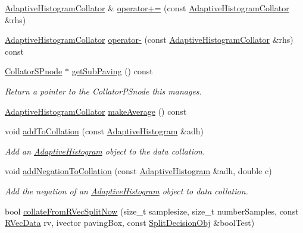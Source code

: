 \begin{DoxyCompactItemize}
\item 
\hyperlink{classsubpavings_1_1AdaptiveHistogramCollator}{\-Adaptive\-Histogram\-Collator} \& \hyperlink{classsubpavings_1_1AdaptiveHistogramCollator_ab1c2f300d93647faa0ca12e52b6405f0}{operator+=} (const \hyperlink{classsubpavings_1_1AdaptiveHistogramCollator}{\-Adaptive\-Histogram\-Collator} \&rhs)
\item 
\hyperlink{classsubpavings_1_1AdaptiveHistogramCollator}{\-Adaptive\-Histogram\-Collator} \hyperlink{classsubpavings_1_1AdaptiveHistogramCollator_aa7ed65f2fced9b8e9e727876e84661c5}{operator-\/} (const \hyperlink{classsubpavings_1_1AdaptiveHistogramCollator}{\-Adaptive\-Histogram\-Collator} \&rhs) const 
\item 
\hyperlink{classsubpavings_1_1CollatorSPnode}{\-Collator\-S\-Pnode} $\ast$ \hyperlink{classsubpavings_1_1AdaptiveHistogramCollator_ac7545dd3425c4570bd9e0fde17ad9294}{get\-Sub\-Paving} () const 
\begin{DoxyCompactList}\small\item\em \-Return a pointer to the \-Collator\-P\-Snode this manages. \end{DoxyCompactList}\item 
\hyperlink{classsubpavings_1_1AdaptiveHistogramCollator}{\-Adaptive\-Histogram\-Collator} \hyperlink{classsubpavings_1_1AdaptiveHistogramCollator_a0437fe89f5ca716f729c7406ca218d3e}{make\-Average} () const 
\item 
void \hyperlink{classsubpavings_1_1AdaptiveHistogramCollator_ade34068ac64cc1bd36781350b28a4486}{add\-To\-Collation} (const \hyperlink{classsubpavings_1_1AdaptiveHistogram}{\-Adaptive\-Histogram} \&adh)
\begin{DoxyCompactList}\small\item\em \-Add an \hyperlink{classsubpavings_1_1AdaptiveHistogram}{\-Adaptive\-Histogram} object to the data collation. \end{DoxyCompactList}\item 
void \hyperlink{classsubpavings_1_1AdaptiveHistogramCollator_aa6e9f2b8750f087a86ac72fe6e1487a9}{add\-Negation\-To\-Collation} (const \hyperlink{classsubpavings_1_1AdaptiveHistogram}{\-Adaptive\-Histogram} \&adh, double c)
\begin{DoxyCompactList}\small\item\em \-Add the negation of an \hyperlink{classsubpavings_1_1AdaptiveHistogram}{\-Adaptive\-Histogram} object to data collation. \end{DoxyCompactList}\item 
bool \hyperlink{classsubpavings_1_1AdaptiveHistogramCollator_a4aeff90166d5791306cddff68289cd22}{collate\-From\-R\-Vec\-Split\-Now} (size\-\_\-t samplesize, size\-\_\-t number\-Samples, const \hyperlink{namespacesubpavings_a30e15e24c8d81a2160d7422ef3c39d68}{\-R\-Vec\-Data} rv, ivector paving\-Box, const \hyperlink{classsubpavings_1_1SplitDecisionObj}{\-Split\-Decision\-Obj} \&bool\-Test)

\end{DoxyCompactItemize}
